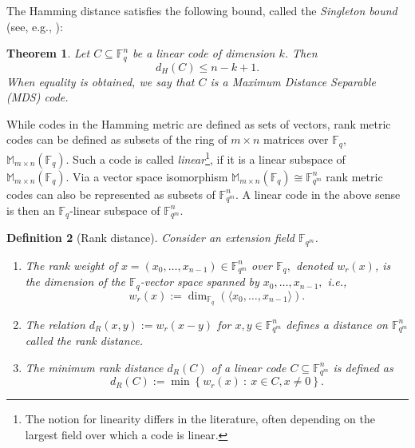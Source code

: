 \documentclass[12pt,paper]{article}
\theoremstyle{plain}
\newtheorem{theorem}{Theorem}[section] %
\newtheorem{definition}[theorem]{Definition}
\newcommand{\Fq}{\mathbb{F}_{q}}
\begin{document}
The Hamming distance satisfies the following bound, called the \emph{Singleton bound} (see, e.g., \cite{Huffman2003}): 
\begin{theorem}
Let $C\subseteq \Fq^n$ be a linear code of dimension $k$. Then
    $$ d_H(C)\leq n-k+1.$$
When equality is obtained, we say that $C$ is a  \emph{Maximum Distance Separable (MDS)} code.
\end{theorem}


  While codes in the Hamming metric are defined as sets of vectors, rank metric codes can be defined as subsets of the ring of $m\times n$ matrices over $\mathbb F_q$, $ \mathbb M_{m\times n}(\Fq).$ Such a code is called \emph{linear}\footnote{The notion for linearity differs in the literature, often depending on the largest field over which a code is linear.}, if it is a linear  subspace of $
\mathbb M_{m\times n}(\Fq).$ 
Via a vector space isomorphism $\mathbb M_{m\times n}(\Fq) \cong \mathbb{F}_{q^m}^n $ rank metric codes can also be represented as subsets of $\mathbb{F}_{q^m}^n$. A linear code in the above sense is then an $\Fq$-linear subspace of $\mathbb{F}_{q^m}^n$.


  

\begin{definition}[Rank distance]\label{rank_weight}
Consider an extension field $\mathbb{F}_{q^m}$.
\begin{enumerate}
\item  The \emph{rank weight} of $ x=(x_0, \ldots, x_{n-1}) \in \mathbb{F}_{q^m}^n$ over $ \mathbb{F}_{q},$ denoted $w_{r}(x)$, is the dimension of the $ \mathbb{F}_{q}$-vector space spanned by $x_0, \ldots, x_{n-1},$ i.e., $$ w_{r}(x):=\dim_{\mathbb{F}_{q}}(\langle x_0,\ldots,x_{n-1}\rangle).$$ 
    \item The relation  $d_R(x, y):=w_r(x-y)$ for $x, y \in \mathbb F_{q^m}^n$ defines a distance on $\mathbb F_{q^m}^n$ called the \emph{rank distance.}
    \item  The \emph{minimum rank distance} $d_R(C)$ of a linear code $C\subseteq \mathbb F_{q^m}^n$ is defined as 
$$ d_R(C):=\min \left\{ w_r(x) \ : \ x \in C, x \neq 0\right\} .$$
\end{enumerate}
\end{definition}
\end{document}
